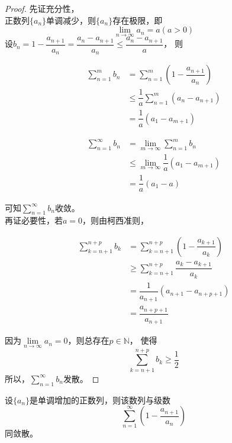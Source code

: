 \begin{proof}
    
    先证充分性，\\
    正数列$\{a_n\}$单调减少，则$\{a_n\}$存在极限，即
    $$\lim\limits_{n\to\infty}{a_n} = a(a>0)$$
    设$b_n=1-\dfrac{a_{n+1}}{a_n} = \dfrac{a_n-a_{n+1}}{a_n}\leq\dfrac{a_n-a_{n+1}}{a}$，
    则

    \begin{align*}
        \sum\limits_{n=1}^{m}{b_n}&=\sum\limits_{n=1}^{m}{(1-\dfrac{a_{n+1}}{a_{n}})}\\
        &\leq\dfrac{1}{a}\sum\limits_{n=1}^{m}{(a_n-a_{n+1})}\\
        &=\dfrac{1}{a}(a_1-a_{m+1})
    \end{align*}

    \begin{align*}
        \sum\limits_{n=1}^{\infty}{b_n} &= \lim\limits_{m\to\infty}{\sum\limits_{n=1}^{m}{b_n}}\\
        &\leq\lim\limits_{m\to\infty}{\dfrac{1}{a}(a_1-a_{m+1})}\\
        & = \dfrac{1}{a}(a_1-a)
    \end{align*}

    可知$\sum\limits_{n=1}^{\infty}{b_n}$收敛。\\
    再证必要性，若$a=0$，则由柯西准则，

    \begin{align*}
        \sum\limits_{k=n+1}^{n+p}{b_k} &= \sum\limits_{k=n+1}^{n+p}{(1-\dfrac{a_{k+1}}{a_k})}\\
        &\geq\sum\limits_{k=n+1}^{n+p}{\dfrac{a_k-a_{k+1}}{a_k}}\\
        & = \dfrac{1}{a_{n+1}}(a_{n+1}-a_{n+p+1})\\
        & = \dfrac{a_{n+p+1}}{a_{n+1}}
    \end{align*}

    因为$\lim\limits_{n\to\infty}{a_n}=0$，则总存在$p \in \mathbb{N}$，
    使得
    $$\sum\limits_{k=n+1}^{n+p}{b_k}\geq\dfrac{1}{2}$$
    所以，$\sum\limits_{n=1}^{\infty}{b_n}$发散。

\end{proof}

\begin{theorem}

    设$\{a_n\}$是单调增加的正数列，则该数列与级数
    $$\sum\limits_{n=1}^{\infty}{(1-\dfrac{a_{n+1}}{a_n})}$$
    同敛散。
        
\end{theorem}

